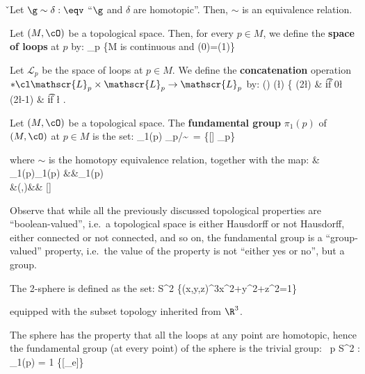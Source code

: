 \v

\bt[]
Let $\g \sim \delta :\eqv$ ``$\g$ and $\delta$ are homotopic''. Then, $\sim$ is an equivalence relation.
\et

Let $(M,\cO)$ be a topological space. Then, for every $p\in M$, we define the \textbf{space of loops} at $p$ by:
\bse
{}_p \coloneqq \{\g\cl[0,1]\to M \mid \g \t{ is continuous and } \g(0)=\g(1)\}
\ese
\ed

\bd [Concatenation]
Let $\mathscr{L}_p$ be the space of loops at $p\in M$. We define the \textbf{concatenation} operation $*\cl
\mathscr{L}_p\times\mathscr{L}_p\to\mathscr{L}_p$ by:
\bse
(\g * \delta) (\l) \coloneqq \left\{  \g(2\l) & \t{if } 0\leq \l \leq {}\\ \delta(2\l-1) & \t{if }
\leq \l {} \ea \right.
\ese
\ed

Let $(M,\cO)$ be a topological space. The \textbf{fundamental group} $\pi_1(p)$ of $(M,\cO)$ at $p\in M$ is the set:
\bse
\pi_1(p) \coloneqq {}_p/\!\sim\ = \{[\g] \mid \g \in {}_p\}
\ese

where $\sim$ is the homotopy equivalence relation, together with the map:
\bullet \cl & \pi_1(p)\times \pi_1(p) &\to &\pi_1(p)\\&(\g,\delta)&\mapsto & [\g]\bullet[\delta] \coloneqq [\g*\delta]
\ei
\ed

Observe that while all the previously discussed topological properties are ``boolean-valued'', i.e.\ a topological
space is either Hausdorff or not Hausdorff, either connected or not connected, and so on, the fundamental group is a
``group-valued'' property, i.e.\ the value of the property is not ``either yes or no'', but a group.

\be
The 2-sphere is defined as the set:
\bse
S^2 \coloneqq \{(x,y,z)\in \R^3\mid x^2+y^2+z^2=1\}
\ese

equipped with the subset topology inherited from $\R^3$.

\begin{center}
\end{center}

The sphere has the property that all the loops at any point are homotopic, hence the fundamental group (at every
point) of the sphere is the trivial group:
\bse
\forall \, p \in S^2 : \pi_1(p) = 1 \coloneqq \{[\g_e]\}
\ese
\ee

